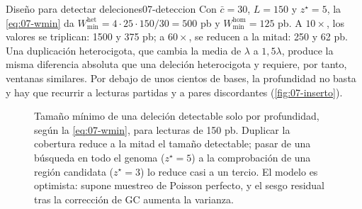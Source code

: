 \begin{ejemplo}{Diseño para detectar deleciones}{07-deteccion}
Con $\bar c=30$, $L=150$ y $z^\star=5$, la \cref{eq:07-wmin} da $W^{\text{het}}_{\min}=4\cdot25\cdot150/30=500$ pb y $W^{\text{hom}}_{\min}=125$ pb. A $10\times$, los valores se triplican: \num{1500} y 375 pb; a $60\times$, se reducen a la mitad: 250 y 62 pb. Una duplicación heterocigota, que cambia la media de $\lambda$ a $1{,}5\lambda$, produce la misma diferencia absoluta que una deleción heterocigota y requiere, por tanto, ventanas similares. Por debajo de unos cientos de bases, la profundidad no basta y hay que recurrir a lecturas partidas y a pares discordantes (\cref{fig:07-inserto}).
\end{ejemplo}

\begin{figure}[tbp]
\centering
{}
\caption[Tamaño mínimo detectable de una deleción]{Tamaño mínimo de una deleción detectable solo por profundidad, según la \cref{eq:07-wmin}, para lecturas de 150 pb. Duplicar la cobertura reduce a la mitad el tamaño detectable; pasar de una búsqueda en todo el genoma ($z^\star=5$) a la comprobación de una región candidata ($z^\star=3$) lo reduce casi a un tercio. El modelo es optimista: supone muestreo de Poisson perfecto, y el sesgo residual tras la corrección de GC aumenta la varianza.}
\label{fig:07-deteccion}
\end{figure}

